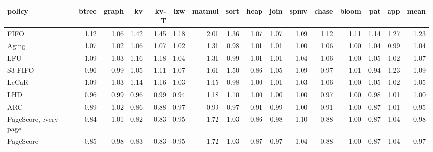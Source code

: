 \begin{tabular}{lrrrrrrrrrrrrrrr}
\toprule
policy & btree & graph & kv & kv-T & lzw & matmul & sort & heap & join & spmv & chase & bloom & pat & app & mean \\
\midrule
FIFO & 1.12 & 1.06 & 1.42 & 1.45 & 1.18 & 2.01 & 1.36 & 1.07 & 1.07 & 1.09 & 1.12 & 1.11 & 1.14 & 1.27 & 1.23 \\
Aging & 1.07 & 1.02 & 1.06 & 1.07 & 1.02 & 1.31 & 0.98 & 1.01 & 1.01 & 1.00 & 1.06 & 1.00 & 1.04 & 0.99 & 1.04 \\
LFU & 1.09 & 1.03 & 1.16 & 1.18 & 1.04 & 1.31 & 0.99 & 1.01 & 1.01 & 1.04 & 1.06 & 1.00 & 1.05 & 1.02 & 1.07 \\
S3-FIFO & 0.96 & 0.99 & 1.05 & 1.11 & 1.07 & 1.61 & 1.50 & 0.86 & 1.05 & 1.09 & 0.97 & 1.01 & 0.94 & 1.23 & 1.09 \\
LeCaR & 1.09 & 1.03 & 1.14 & 1.16 & 1.03 & 1.15 & 0.98 & 1.00 & 1.01 & 1.03 & 1.06 & 1.00 & 1.05 & 1.02 & 1.05 \\
LHD & 0.96 & 0.99 & 0.96 & 0.99 & 0.94 & 1.18 & 1.10 & 1.00 & 1.00 & 1.00 & 0.97 & 1.00 & 0.98 & 1.01 & 1.00 \\
ARC & 0.89 & 1.02 & 0.86 & 0.88 & 0.97 & 0.99 & 0.97 & 0.91 & 0.99 & 1.00 & 0.91 & 1.00 & 0.87 & 1.01 & 0.95 \\
PageScore, every page & 0.84 & 1.01 & 0.82 & 0.83 & 0.95 & 1.72 & 1.03 & 0.86 & 0.98 & 1.10 & 0.88 & 1.00 & 0.87 & 1.04 & 0.98 \\
PageScore & 0.85 & 0.98 & 0.83 & 0.83 & 0.95 & 1.72 & 1.03 & 0.87 & 0.97 & 1.04 & 0.88 & 1.00 & 0.87 & 1.04 & 0.97 \\
\bottomrule
\end{tabular}
